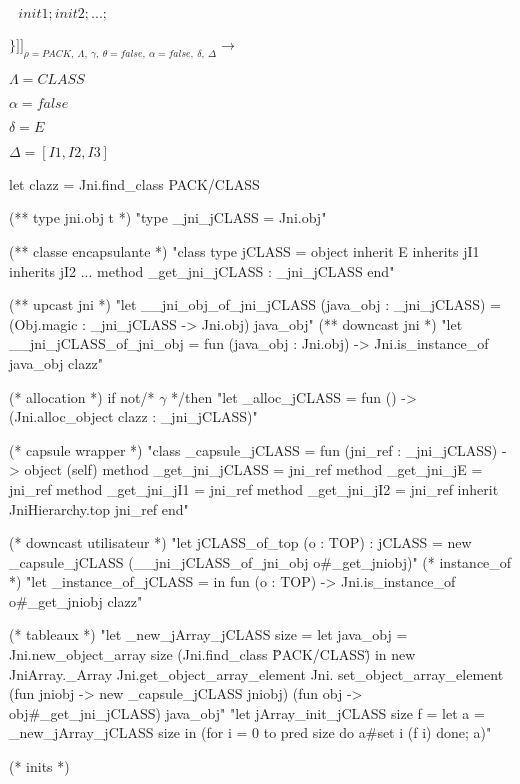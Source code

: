 \documentclass[a4paper, 11pt, notitlepage]{article}
\begin{document}
  $\ \ \ init1; init2; ...;$

 $\} ]\!]_{\rho=PACK,\ \Lambda,\ \gamma,\ \theta=false,\ \alpha=false,\ \delta,\ \Delta}\longrightarrow$
\ 
\newline

$\Lambda=CLASS$

$\alpha=false$

$\delta=E$

$\Delta=[I1,I2,I3]$

\begin{OCaml}
   let clazz = Jni.find_class PACK/CLASS

(** type jni.obj t *)
"type _jni_jCLASS = Jni.obj"

(** classe encapsulante *)
"class type jCLASS =
   object inherit E
   inherits jI1
   inherits jI2 ...
   method _get_jni_jCLASS : _jni_jCLASS
   end"

(** upcast jni *)
"let __jni_obj_of_jni_jCLASS (java_obj : _jni_jCLASS) =
   (Obj.magic : _jni_jCLASS -> Jni.obj) java_obj"
(** downcast jni *)
"let __jni_jCLASS_of_jni_obj =
   fun (java_obj : Jni.obj) ->
     Jni.is_instance_of java_obj clazz"
 
(* allocation *)
if not/* $\gamma$ */then
"let _alloc_jCLASS =
     fun () -> (Jni.alloc_object clazz : _jni_jCLASS)"

(* capsule wrapper *)
"class _capsule_jCLASS = fun (jni_ref : _jni_jCLASS) ->
    object (self)
      method _get_jni_jCLASS = jni_ref
      method _get_jni_jE = jni_ref
      method _get_jni_jI1 = jni_ref
      method _get_jni_jI2 = jni_ref
      inherit JniHierarchy.top jni_ref
    end"

(* downcast utilisateur *)
"let jCLASS_of_top (o : TOP) : jCLASS =
    new _capsule_jCLASS (__jni_jCLASS_of_jni_obj o#_get_jniobj)"
(* instance_of *)
"let _instance_of_jCLASS =
    in fun (o : TOP) -> Jni.is_instance_of o#_get_jniobj clazz"

(* tableaux *)
"let _new_jArray_jCLASS size =
    let java_obj = Jni.new_object_array size (Jni.find_class \"PACK/CLASS\")
    in
      new JniArray._Array Jni.get_object_array_element Jni.
        set_object_array_element (fun jniobj -> new _capsule_jCLASS jniobj)
        (fun obj -> obj#_get_jni_jCLASS) java_obj"
"let jArray_init_jCLASS size f =
    let a = _new_jArray_jCLASS size
    in (for i = 0 to pred size do a#set i (f i) done; a)"

(* inits *)
\end{OCaml}
\end{document}
